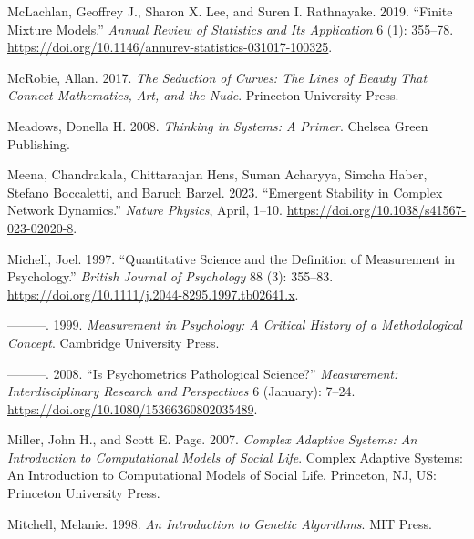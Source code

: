 \documentclass[
  letterpaper,
]{scrbook}
\newlength{\cslhangindent}
\newlength{\cslentryspacingunit} %
\newenvironment{CSLReferences}[2] %
 {%
  \setlength{\parindent}{0pt}
  \ifodd #1
  \let\oldpar\par
  \def\par{\hangindent=\cslhangindent\oldpar}
  \fi
  \setlength{\parskip}{#2\cslentryspacingunit}
 }%
 {}
\begin{document}
\begin{CSLReferences}{1}{0}
\leavevmode{}%
McLachlan, Geoffrey J., Sharon X. Lee, and Suren I. Rathnayake. 2019.
{``Finite {Mixture Models}.''} \emph{Annual Review of Statistics and Its
Application} 6 (1): 355--78.
\url{https://doi.org/10.1146/annurev-statistics-031017-100325}.

\leavevmode{}%
McRobie, Allan. 2017. \emph{The {Seduction} of {Curves}: {The Lines} of
{Beauty That Connect Mathematics}, {Art}, and the {Nude}}. {Princeton
University Press}.

\leavevmode{}%
Meadows, Donella H. 2008. \emph{Thinking in {Systems}: {A Primer}}.
{Chelsea Green Publishing}.

\leavevmode{}%
Meena, Chandrakala, Chittaranjan Hens, Suman Acharyya, Simcha Haber,
Stefano Boccaletti, and Baruch Barzel. 2023. {``Emergent Stability in
Complex Network Dynamics.''} \emph{Nature Physics}, April, 1--10.
\url{https://doi.org/10.1038/s41567-023-02020-8}.

\leavevmode{}%
Michell, Joel. 1997. {``Quantitative Science and the Definition of
Measurement in Psychology.''} \emph{British Journal of Psychology} 88
(3): 355--83. \url{https://doi.org/10.1111/j.2044-8295.1997.tb02641.x}.

\leavevmode{}%
---------. 1999. \emph{Measurement in {Psychology}: {A Critical History}
of a {Methodological Concept}}. {Cambridge University Press}.

\leavevmode{}%
---------. 2008. {``Is {Psychometrics Pathological Science}?''}
\emph{Measurement: Interdisciplinary Research and Perspectives} 6
(January): 7--24. \url{https://doi.org/10.1080/15366360802035489}.

\leavevmode{}%
Miller, John H., and Scott E. Page. 2007. \emph{Complex Adaptive
Systems: {An} Introduction to Computational Models of Social Life}.
Complex Adaptive Systems: {An} Introduction to Computational Models of
Social Life. {Princeton, NJ, US}: {Princeton University Press}.

\leavevmode{}%
Mitchell, Melanie. 1998. \emph{An {Introduction} to {Genetic
Algorithms}}. {MIT Press}.


\end{CSLReferences}
\end{document}
